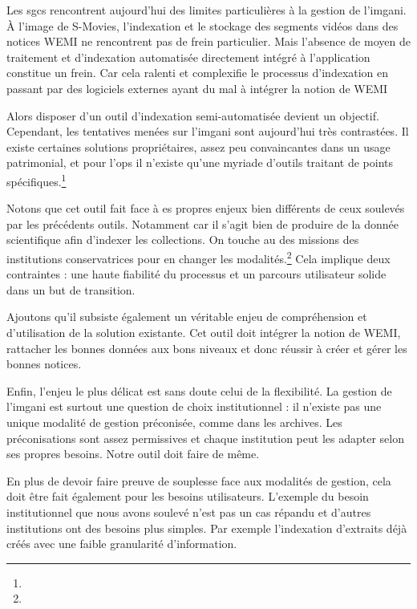 
Les \glspl{sgc} rencontrent aujourd'hui des limites particulières à la gestion de l'\gls{imgani}. À l'image de S-Movies, l'indexation et le stockage des segments vidéos dans des notices \gls{WEMI} ne rencontrent pas de frein particulier. Mais l'absence de moyen de traitement et d'indexation automatisée directement intégré à l'application constitue un frein. Car cela ralenti et complexifie le processus d'indexation en passant par des logiciels externes ayant du mal à intégrer la notion de \gls{WEMI}

Alors disposer d'un outil d'indexation semi-automatisée devient un objectif. Cependant, les tentatives menées sur l'\gls{imgani} sont aujourd'hui très contrastées. Il existe certaines solutions propriétaires, assez peu convaincantes dans un usage patrimonial, et pour l'\gls{ops} il n'existe qu'une myriade d'outils traitant de points spécifiques.\footnote{}\newline

Notons que cet outil fait face à es propres enjeux bien différents de ceux soulevés par les précédents outils. Notamment car il s'agit bien de produire de la donnée scientifique afin d'indexer les collections. On touche au \coeur des missions des institutions conservatrices pour en changer les modalités.\footnote{} Cela implique deux contraintes :  une haute fiabilité du processus et un parcours utilisateur solide dans un but de transition. 

Ajoutons qu'il subsiste également un véritable enjeu de compréhension et d'utilisation de la solution existante. Cet outil doit intégrer la notion de \gls{WEMI}, rattacher les bonnes données aux bons niveaux et donc réussir à créer et gérer les bonnes notices.

Enfin, l'enjeu le plus délicat est sans doute celui de la flexibilité. La gestion de l'\gls{imgani} est surtout une question de choix institutionnel : il n'existe pas une unique modalité de gestion préconisée, comme dans les archives. Les préconisations sont assez permissives et chaque institution peut les adapter selon ses propres besoins. Notre outil doit faire de même.

En plus de devoir faire preuve de souplesse face aux modalités de gestion, cela doit être fait également pour les besoins utilisateurs. L'exemple du besoin institutionnel que nous avons soulevé n'est pas un cas répandu et d'autres institutions ont des besoins plus simples. Par exemple l'indexation d'extraits déjà créés avec une faible granularité d'information.

